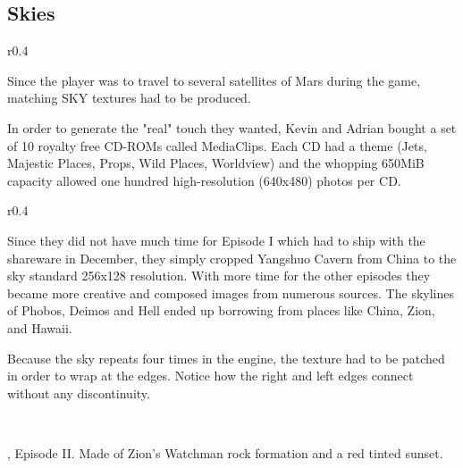 \subsection{Skies}
\begin{wrapfigure}[7]{r}{0.4\textwidth}
\centering
{}
\end{wrapfigure}
Since the player was to travel to several satellites of Mars during the game, matching SKY textures had to be produced.\\
\par In order to generate the "real" touch they wanted, Kevin and Adrian bought a set of 10 royalty free CD-ROMs called MediaClips. Each CD had a theme (Jets, Majestic Places, Props, Wild Places, Worldview) and the whopping 650MiB capacity allowed one hundred high-resolution (640x480) photos per CD.\\
\par 

\begin{wrapfigure}[7]{r}{0.4\textwidth}
\centering
{}
\end{wrapfigure}

Since they did not have much time for Episode I which had to ship with the shareware in December, they simply cropped Yangshuo Cavern from China to the sky standard 256x128 resolution.  With more time for the other episodes they became more creative and composed images from numerous sources. The skylines of Phobos, Deimos and Hell ended up borrowing from places like China, Zion, and Hawaii. \\
\par

Because the sky repeats four times in the engine, the texture had to be patched in order to wrap at the edges. Notice how the right and left edges connect without any discontinuity.\\
\par
{}\\
\par
{}





\begin{minipage}{\textwidth}
\par \vspace{5pt}
\doom{}, Episode II. Made of Zion's Watchman rock formation and a red tinted sunset.\\
\par
{}
\end{minipage}






